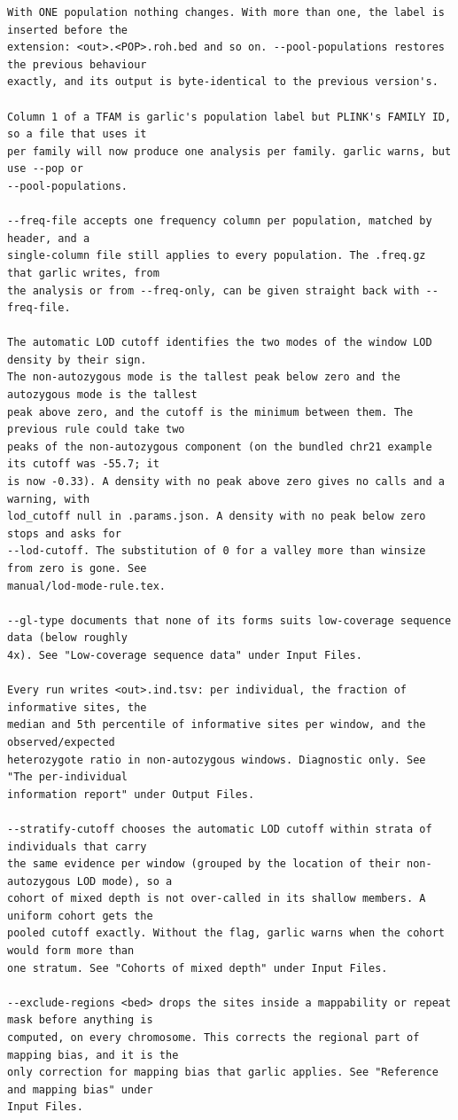 \documentclass[12pt]{article}%
\begin{document}
\begin{lstlisting}
With ONE population nothing changes. With more than one, the label is inserted before the
extension: <out>.<POP>.roh.bed and so on. --pool-populations restores the previous behaviour
exactly, and its output is byte-identical to the previous version's.

Column 1 of a TFAM is garlic's population label but PLINK's FAMILY ID, so a file that uses it
per family will now produce one analysis per family. garlic warns, but use --pop or
--pool-populations.

--freq-file accepts one frequency column per population, matched by header, and a
single-column file still applies to every population. The .freq.gz that garlic writes, from
the analysis or from --freq-only, can be given straight back with --freq-file.

The automatic LOD cutoff identifies the two modes of the window LOD density by their sign.
The non-autozygous mode is the tallest peak below zero and the autozygous mode is the tallest
peak above zero, and the cutoff is the minimum between them. The previous rule could take two
peaks of the non-autozygous component (on the bundled chr21 example its cutoff was -55.7; it
is now -0.33). A density with no peak above zero gives no calls and a warning, with
lod_cutoff null in .params.json. A density with no peak below zero stops and asks for
--lod-cutoff. The substitution of 0 for a valley more than winsize from zero is gone. See
manual/lod-mode-rule.tex.

--gl-type documents that none of its forms suits low-coverage sequence data (below roughly
4x). See "Low-coverage sequence data" under Input Files.

Every run writes <out>.ind.tsv: per individual, the fraction of informative sites, the
median and 5th percentile of informative sites per window, and the observed/expected
heterozygote ratio in non-autozygous windows. Diagnostic only. See "The per-individual
information report" under Output Files.

--stratify-cutoff chooses the automatic LOD cutoff within strata of individuals that carry
the same evidence per window (grouped by the location of their non-autozygous LOD mode), so a
cohort of mixed depth is not over-called in its shallow members. A uniform cohort gets the
pooled cutoff exactly. Without the flag, garlic warns when the cohort would form more than
one stratum. See "Cohorts of mixed depth" under Input Files.

--exclude-regions <bed> drops the sites inside a mappability or repeat mask before anything is
computed, on every chromosome. This corrects the regional part of mapping bias, and it is the
only correction for mapping bias that garlic applies. See "Reference and mapping bias" under
Input Files.


\end{lstlisting}
\end{document}
